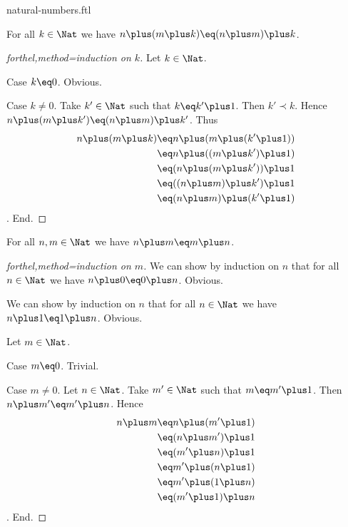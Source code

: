 \documentclass{naproche-library}
\begin{document}
\begin{smodule}{natural-numbers.ftl}
  \begin{proposition}[forthel,title=Associativity,id=PlusIsAssociativeProp]
    For all $k\in\Nat$ we have $n\plus(m\plus k)\eq(n\plus m)\plus k$.
  \end{proposition}
  \begin{proof}[forthel,method=induction on $k$]
    Let $k\in\Nat$.

    Case $k\eq0$. Obvious.

    Case $k\neq0$.
      Take $k'\in\Nat$ such that $k\eq k'\plus1$.
      Then $k'\prec k$.
      Hence $n\plus(m\plus k')\eq(n\plus m)\plus k'$.
      Thus
      \begin{align*}
        n\plus(m\plus k)
          &\eq n\plus(m\plus(k'\plus1))\\
          &\eq n\plus((m\plus k')\plus1)\\
          &\eq (n\plus(m\plus k'))\plus1\\
          &\eq ((n\plus m)\plus k')\plus1\\
          &\eq (n\plus m)\plus(k'\plus1)
      \end{align*}.
    End.
  \end{proof}

  \begin{proposition}[forthel,title=Commutativity,id=PlusIsCommutativeProp]
    For all $n,m\in\Nat$ we have $n\plus m\eq m\plus n$.
  \end{proposition}
  \begin{proof}[forthel,method=induction on $m$]
    We can show by induction on $n$ that for all $n\in\Nat$ we have $n\plus0\eq0\plus n$.
    Obvious.

    We can show by induction on $n$ that for all $n\in\Nat$ we have $n\plus1\eq1\plus n$.
    Obvious.

    Let $m\in\Nat$.

    Case $m\eq0$. Trivial.

    Case $m\neq0$.
      Let $n\in\Nat$.
      Take $m'\in\Nat$ such that $m\eq m'\plus1$.
      Then $n\plus m'\eq m'\plus n$.
      Hence
      \begin{align*}
        n\plus m
          &\eq n\plus(m'\plus1)\\
          &\eq (n\plus m')\plus1\\
          &\eq (m'\plus n)\plus1\\
          &\eq m'\plus(n\plus1)\\
          &\eq m'\plus(1\plus n)\\
          &\eq (m'\plus1)\plus n
      \end{align*}.
    End.
  \end{proof}


\end{smodule}
\end{document}
